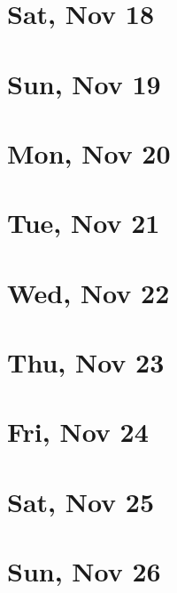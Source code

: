 	\section{Sat, Nov 18}
		
		
	\section{Sun, Nov 19}
		
		
	\section{Mon, Nov 20}
		
		
	\section{Tue, Nov 21}
		
		
	\section{Wed, Nov 22}
		
		
	\section{Thu, Nov 23}
		
		
	\section{Fri, Nov 24}
		
		
	\section{Sat, Nov 25}
		
		
	\section{Sun, Nov 26}
		
		
